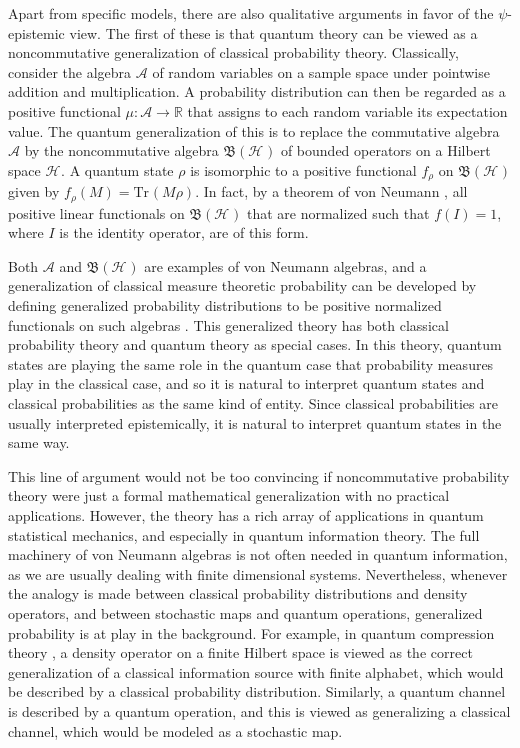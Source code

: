 \documentclass[DIV=calc,fontsize=12pt]{scrartcl} %
\theoremstyle{definition}
\theoremstyle{plain}
\newcommand{\Hilb}[1][]{\ensuremath{\mathcal{H}_{#1}}}
\newcommand{\Tr}[2][]{\ensuremath{\text{Tr}_{#1} \left ( #2 \right )}}
\begin{document}
Apart from specific models, there are also qualitative arguments in
favor of the $\psi$-epistemic view.  The first of these is that
quantum theory can be viewed as a noncommutative generalization of
classical probability theory.  Classically, consider the algebra
$\mathcal{A}$ of random variables on a sample space under pointwise
addition and multiplication.  A probability distribution can then be
regarded as a positive functional $\mu:\mathcal{A} \rightarrow
\mathbb{R}$ that assigns to each random variable its expectation
value.  The quantum generalization of this is to replace the
commutative algebra $\mathcal{A}$ by the noncommutative algebra
$\mathfrak{B} \left ( \Hilb \right )$ of bounded operators on a
Hilbert space $\Hilb$.  A quantum state $\rho$ is isomorphic to a
positive functional $f_{\rho}$ on $\mathfrak{B}(\Hilb)$ given by
$f_{\rho}(M) = \Tr{M \rho}$.  In fact, by a theorem of von Neumann
\cite{Neumann1955}, all positive linear functionals on $\mathfrak{B}
\left ( \Hilb \right )$ that are normalized such that $f(I) = 1$,
where $I$ is the identity operator, are of this form.

Both $\mathcal{A}$ and $\mathfrak{B} \left ( \Hilb \right )$ are
examples of von Neumann algebras, and a generalization of classical
measure theoretic probability can be developed by defining generalized
probability distributions to be positive normalized functionals on
such algebras \cite{Redei2007, Petz2008}.  This generalized theory has
both classical probability theory and quantum theory as special cases.
In this theory, quantum states are playing the same role in the
quantum case that probability measures play in the classical case, and
so it is natural to interpret quantum states and classical
probabilities as the same kind of entity.  Since classical
probabilities are usually interpreted epistemically, it is natural to
interpret quantum states in the same way.

This line of argument would not be too convincing if noncommutative
probability theory were just a formal mathematical generalization with
no practical applications.  However, the theory has a rich array of
applications in quantum statistical mechanics, and especially in
quantum information theory.  The full machinery of von Neumann
algebras is not often needed in quantum information, as we are usually
dealing with finite dimensional systems.  Nevertheless, whenever the
analogy is made between classical probability distributions and
density operators, and between stochastic maps and quantum operations,
generalized probability is at play in the background.  For example, in
quantum compression theory \cite{Schumacher1995}, a density operator
on a finite Hilbert space is viewed as the correct generalization of a
classical information source with finite alphabet, which would be
described by a classical probability distribution.  Similarly, a
quantum channel is described by a quantum operation, and this is
viewed as generalizing a classical channel, which would be modeled as
a stochastic map.
\end{document}
